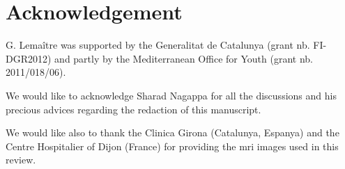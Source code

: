 \section{Acknowledgement} \label{sec:acknowledgement}

G. Lema\^itre was supported by the Generalitat de Catalunya (grant nb. FI-DGR2012) and partly by the Mediterranean Office for Youth (grant nb. 2011/018/06).

We would like to acknowledge Sharad Nagappa for all the discussions and his precious advices regarding the redaction of this manuscript.

We would like also to thank the Clinica Girona (Catalunya, Espanya) and the Centre Hospitalier of Dijon (France) for providing the \ac{mri} images used in this review.
